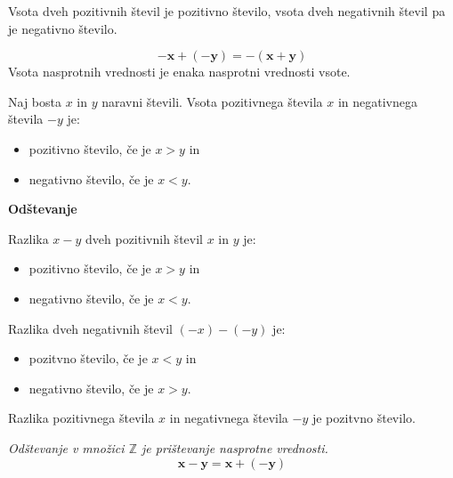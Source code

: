         \begin{frame}

            \begin{block}{}
                Vsota dveh pozitivnih števil je pozitivno število, vsota dveh negativnih števil pa je negativno število.
            \end{block}

            \begin{block}{}
                $$\mathbf{-x+(-y)=-(x+y)}$$
                Vsota nasprotnih vrednosti je enaka nasprotni vrednosti vsote.
            \end{block}

            \begin{block}{}
                Naj bosta $x$ in $y$ naravni števili. Vsota pozitivnega števila $x$ in negativnega števila $-y$ je:
                \begin{itemize}
                    \item pozitivno število, če je $x>y$ in
                    \item negativno število, če je $x<y$.
                \end{itemize}
            \end{block}
        \end{frame}


        \begin{frame}
            \textbf{\large{Odštevanje}}

            \begin{block}{}
                Razlika $x-y$ dveh pozitivnih števil $x$ in $y$ je:
                \begin{itemize}
                    \item pozitivno število, če je $x>y$ in 
                    \item negativno število, če je $x<y$.
                \end{itemize}
            \end{block}

            \begin{block}{}
                Razlika dveh negativnih števil $(-x)-(-y)$ je:
                \begin{itemize}
                    \item pozitvno število, če je $x<y$ in 
                    \item negativno število, če je $x>y$.
                \end{itemize}
            \end{block}

            \begin{block}{}
                Razlika pozitivnega števila $x$ in negativnega števila $-y$ je pozitvno število.
            \end{block}


            \begin{alertblock}{}
                \textit{Odštevanje v množici $\mathbb{Z}$ je prištevanje nasprotne vrednosti.}
                $$\mathbf{x-y=x+(-y)} $$
            \end{alertblock}
        \end{frame}

